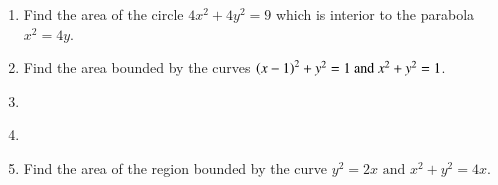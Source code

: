 \begin{enumerate}[label=\thesubsection.\arabic*,ref=\thesubsection.\theenumi]

\item 
	Find the area of the circle $4x^2+4y^2=9$ which is interior to the parabola $x^2=4y$.\\
	\solution
\label{chapters/12/8/2/1}

\item Find the area bounded by the curves $\left(x-1\right)^2 + y^2 = 1 \text{ and } x^2+y^2=1$.
\label{chapters/12/8/2/2}
\\
\solution

\item 
\label{chapters/12/8/3/2}

\item 
\label{chapters/12/8/3/18}

\item Find the area of the region bounded by the curve $y^2 = 2x\text{ and }x^2 + y^2 = 4x$.
\end{enumerate}
